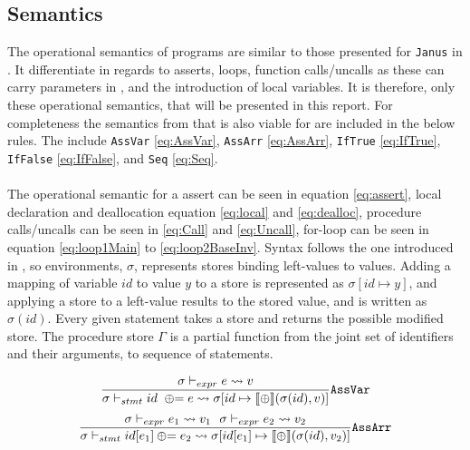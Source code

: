 \subsection{Semantics \rr}
The operational semantics of \lan programs are similar to those presented for \texttt{Janus}
in \cite{janus}. It differentiate in regards to asserts, loops, function calls/uncalls
as these can carry parameters in \lan, and the introduction of local
variables. It is therefore, only these operational semantics, that will be presented in this
report. For completeness the semantics from \cite{janus} that is also viable for \lan are
included in the below rules. The include \texttt{AssVar} \eqref{eq:AssVar}, \texttt{AssArr}
\eqref{eq:AssArr}, \texttt{IfTrue} \eqref{eq:IfTrue}, \texttt{IfFalse} \eqref{eq:IfFalse},
and \texttt{Seq} \eqref{eq:Seq}.
\\
\\
The operational semantic for a \lan assert can be seen in equation \eqref{eq:assert},
local declaration and deallocation equation \eqref{eq:local} and \eqref{eq:dealloc},
procedure calls/uncalls can be seen in \eqref{eq:Call} and \eqref{eq:Uncall},
for-loop can be seen in equation \eqref{eq:loop1Main} to
\eqref{eq:loop2BaseInv}. Syntax follows the one introduced in \cite{pld}, so
environments, $\sigma$, represents stores binding left-values
to values. Adding a mapping of variable $id$ to value $y$ to a store is represented as
$\sigma[id \mapsto y]$, and applying a store to a left-value results to the stored value,
and is written as $\sigma(id)$. Every given statement takes a store and returns the possible
modified store. The procedure store $\Gamma$ is a partial function from the joint set
of identifiers and their arguments, to sequence of statements.

\begin{multicols}{2}
    \begin{equation} \label{eq:AssVar}
        \frac{\sigma \vdash_{expr} e \leadsto v}
        {\sigma \vdash_{stmt} id~ \oplus{\kern-5.0pt}= e \leadsto
            \sigma[id \mapsto \llbracket \oplus \rrbracket(\sigma(id), v)]}
        \text{\texttt{AssVar}}
    \end{equation}
    \break
    \begin{equation} \label{eq:AssArr}
        \frac{\sigma \vdash_{expr} e_1 \leadsto v_1 ~~
            \sigma \vdash_{expr} e_2 \leadsto v_2}
        {\sigma \vdash_{stmt} id[e_1] \oplus{\kern-5.0pt}= e_2 \leadsto
            \sigma[id[e_1] \mapsto \llbracket\oplus\rrbracket(\sigma(id), v_2)]}
        \text{\texttt{AssArr}}
    \end{equation}
\end{multicols}

